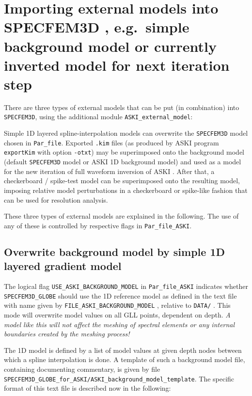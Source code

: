 \documentclass[12pt,a4paper]{article}
\newcommand{\lcode}[1]{\nolinkurl{#1}}
\newcommand{\lcodetitle}[1]{ {\ttfamily #1} }
\newcommand{\ASKI}{ {\ttfamily ASKI} }
\begin{document}
\section{Importing external models into \lcodetitle{SPECFEM3D}, e.g.\ simple background model or currently inverted model for next iteration step} \label{import_model}
%
There are three types of external models that can be put (in combination) into \lcode{SPECFEM3D}, 
using the additional module \lcode{ASKI_external_model}:

Simple 1D layered spline-interpolation models can overwrite the \lcode{SPECFEM3D} model chosen in
\lcode{Par_file}.
Exported \lcode{.kim} files (as produced by \ASKI{} program \lcode{exportKim} with option \lcode{-otxt}) may be 
superimposed onto the background model (default \lcode{SPECFEM3D} model or \ASKI{} 1D background model) 
and used as a model for the new iteration of full waveform inversion of \ASKI{}. 
After that, a checkerboard / spike-test model can be superimposed onto the resulting model, imposing relative
model perturbations in a checkerboard or spike-like fashion that can be used for resolution analysis.

These three types of external models are explained in the following. The use of any of these is controlled by
respective flags in \lcode{Par_file_ASKI}.

\subsection{Overwrite background model by simple 1D layered gradient model} \label{import_model:ssec_1D}
The logical flag \lcode{USE_ASKI_BACKGROUND_MODEL} in \lcode{Par_file_ASKI} indicates whether 
\lcode{SPECFEM3D_GLOBE} should use the 1D reference model as defined in the text file with name given by 
\lcode{FILE_ASKI_BACKGROUND_MODEL} , relative to \lcode{DATA/} .
This mode will overwrite model values on all GLL points, dependent on depth. 
\emph{A model like this will not affect the meshing of spectral elements or any internal boundaries created
by the meshing process!}

The 1D model is defined by a list of model values at given depth nodes between which a spline interpolation 
is done. 
A template of such a background model file, containing documenting commentary, is given by file 
\lcode{SPECFEM3D_GLOBE_for_ASKI/ASKI_background_model_template}.
The specific format of this text file is described now in the following:
\end{document}
